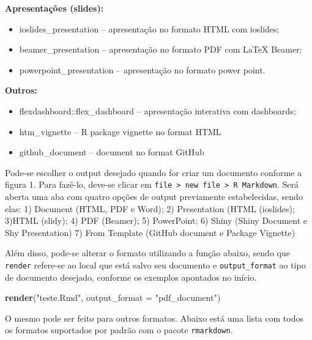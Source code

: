 \documentclass[
]{book}
\newenvironment{Shaded}{\begin{snugshade}}{\end{snugshade}}
\newcommand{\DataTypeTok}[1]{\textcolor[rgb]{0.13,0.29,0.53}{#1}}
\newcommand{\KeywordTok}[1]{\textcolor[rgb]{0.13,0.29,0.53}{\textbf{#1}}}
\newcommand{\NormalTok}[1]{#1}
\newcommand{\StringTok}[1]{\textcolor[rgb]{0.31,0.60,0.02}{#1}}
\providecommand{\tightlist}{%
  \setlength{\itemsep}{0pt}\setlength{\parskip}{0pt}}
\begin{document}
\textbf{Apresentações (slides):}

\begin{itemize}
\tightlist
\item
  ioslides\_presentation -- apresentação no formato HTML com ioslides;
\item
  beamer\_presentation -- apresentação no formato PDF com LaTeX Beamer;
\item
  powerpoint\_presentation -- apresentação no formato power point.
\end{itemize}

\textbf{Outros:}

\begin{itemize}
\tightlist
\item
  flexdashboard::flex\_dashboard -- apresentação interativa com dashboards;
\item
  htm\_vignette -- R package vignette no format HTML
\item
  github\_document -- document no format GitHub
\end{itemize}

Pode-se escolher o output desejado quando for criar um documento conforme a figura 1. Para fazê-lo, deve-se clicar em \texttt{file\ \textgreater{}\ new\ file\ \textgreater{}\ R\ Markdown}. Será aberta uma aba com quatro opções de output previamente estabelecidas, sendo elas:
1) Document (HTML, PDF e Word);
2) Presentation (HTML (ioslides);
3)HTML (slidy);
4) PDF (Beamer);
5) PowerPoint;
6) Shiny (Shiny Document e Shy Presentation)
7) From Template (GitHub document e Package Vignette)

Além disso, pode-se alterar o formato utilizando a função abaixo, sendo que \texttt{render} refere-se ao local que está salvo seu documento e \texttt{output\_format} ao tipo de documento desejado, conforme os exemplos apontados no início.

\begin{Shaded}
\begin{Highlighting}[]
\KeywordTok{render}\NormalTok{(}\StringTok{"teste.Rmd"}\NormalTok{, }\DataTypeTok{output\_format =} \StringTok{"pdf\_document"}\NormalTok{)}
\end{Highlighting}
\end{Shaded}

O mesmo pode ser feito para outros formatos.
Abaixo está uma lista com todos os formatos suportados por padrão com o pacote \texttt{rmarkdown}.
\end{document}
